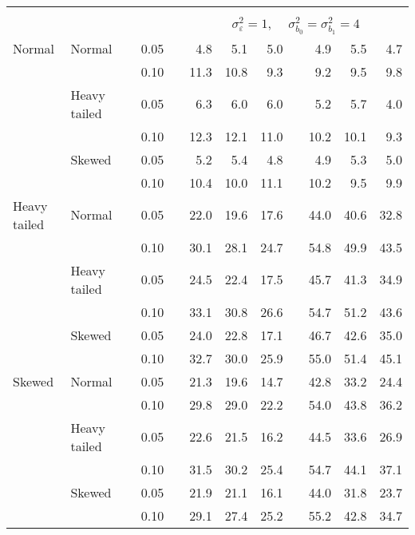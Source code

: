 \begin{table}[ht]
\begin{scriptsize}
\begin{center}
\begin{tabular}{ll p{.1cm} c p{.1cm} rrr p{.1cm} rrr}
&&&&&&&&&&&\\
& && && \multicolumn{7}{c}{$\sigma_{\varepsilon}^2 = 1$, \ \ $\sigma_{b_0}^2 = \sigma_{b_1}^2 = 4$} \\ \cline{6-12}
Normal       & Normal       && 0.05 &&   4.8 & 5.1 & 5.0 &   & 4.9 & 5.5 & 4.7 \\ 
             &              && 0.10 &&   11.3 & 10.8 & 9.3 &   & 9.2 & 9.5 & 9.8 \\ 
             & Heavy tailed && 0.05 &&   6.3 & 6.0 & 6.0 &   & 5.2 & 5.7 & 4.0 \\ 
             &              && 0.10 &&   12.3 & 12.1 & 11.0 &   & 10.2 & 10.1 & 9.3 \\ 
             & Skewed       && 0.05 &&   5.2 & 5.4 & 4.8 &   & 4.9 & 5.3 & 5.0 \\ 
             &              && 0.10 &&   10.4 & 10.0 & 11.1 &   & 10.2 & 9.5 & 9.9 \\ 
Heavy tailed & Normal       && 0.05 &&   22.0 & 19.6 & 17.6 &   & 44.0 & 40.6 & 32.8 \\ 
             &              && 0.10 &&   30.1 & 28.1 & 24.7 &   & 54.8 & 49.9 & 43.5 \\ 
             & Heavy tailed && 0.05 &&   24.5 & 22.4 & 17.5 &   & 45.7 & 41.3 & 34.9 \\ 
             &              && 0.10 &&   33.1 & 30.8 & 26.6 &   & 54.7 & 51.2 & 43.6 \\ 
             & Skewed       && 0.05 &&   24.0 & 22.8 & 17.1 &   & 46.7 & 42.6 & 35.0 \\ 
             &              && 0.10 &&   32.7 & 30.0 & 25.9 &   & 55.0 & 51.4 & 45.1 \\ 
Skewed       & Normal       && 0.05 &&   21.3 & 19.6 & 14.7 &   & 42.8 & 33.2 & 24.4 \\ 
             &              && 0.10 &&   29.8 & 29.0 & 22.2 &   & 54.0 & 43.8 & 36.2 \\ 
             & Heavy tailed && 0.05 &&   22.6 & 21.5 & 16.2 &   & 44.5 & 33.6 & 26.9 \\ 
             &              && 0.10 &&   31.5 & 30.2 & 25.4 &   & 54.7 & 44.1 & 37.1 \\ 
             & Skewed       && 0.05 &&   21.9 & 21.1 & 16.1 &   & 44.0 & 31.8 & 23.7 \\ 
             &              && 0.10 &&   29.1 & 27.4 & 25.2 &   & 55.2 & 42.8 & 34.7 \\ 


\hline
\end{tabular}
\end{center}
\end{scriptsize}
\end{table}

